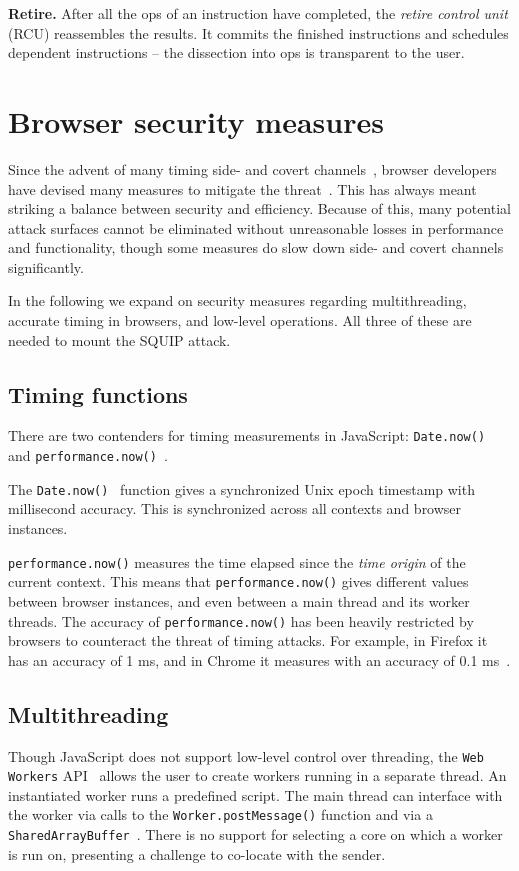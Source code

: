 \documentclass[11pt,
  titlepage=false,
]{scrreprt}
\begin{document}
\textbf{Retire.}
After all the \textmu ops of an instruction have completed, the \textit{retire control unit} (RCU) reassembles the results.
It commits the finished instructions and schedules dependent instructions -- the dissection into \textmu ops is transparent to the user.


\section{Browser security measures}
\label{sec:browsersecurity}
Since the advent of many timing side- and covert channels~\cite{noack2018exploiting, Rokicki2022webport, gruss2016rowhammer}, browser developers have devised many measures to mitigate the threat~\cite{shusterman2021prime, performancenow, performancenowchrome}.
This has always meant striking a balance between security and efficiency.
Because of this, many potential attack surfaces cannot be eliminated without unreasonable losses in performance and functionality, though some measures do slow down side- and covert channels significantly.

In the following we expand on security measures regarding multithreading, accurate timing in browsers, and low-level operations.
All three of these are needed to mount the SQUIP attack.


\subsection{Timing functions}\label{subsec:timingjs}
There are two contenders for timing measurements in JavaScript: \texttt{Date.now()}~\cite{datenow} and \texttt{performance.now()}~\cite{performancenow}.

The \texttt{Date.now()}~\cite{datenow} function gives a synchronized Unix epoch timestamp with millisecond accuracy.
This is synchronized across all contexts and browser instances.

\texttt{performance.now()} measures the time elapsed since the \textit{time origin} of the current context.
This means that \texttt{performance.now()} gives different values between browser instances, and even between a main thread and its worker threads.
The accuracy of \texttt{performance.now()} has been heavily restricted by browsers to counteract the threat of timing attacks.
For example, in Firefox it has an accuracy of 1 ms, and in Chrome it measures with an accuracy of 0.1 ms~\cite{performancenow, performancenowchrome}.

\subsection{Multithreading}\label{subsec:multithreading}
Though JavaScript does not support low-level control over threading, the \texttt{Web Workers} API~\cite{webworkers} allows the user to create workers running in a separate thread.
An instantiated worker runs a predefined script.
The main thread can interface with the worker via calls to the \texttt{Worker.postMessage()} function and via a \texttt{SharedArrayBuffer}~\cite{sharedarraybuffer}.
There is no support for selecting a core on which a worker is run on, presenting a challenge to co-locate with the sender.
\end{document}
